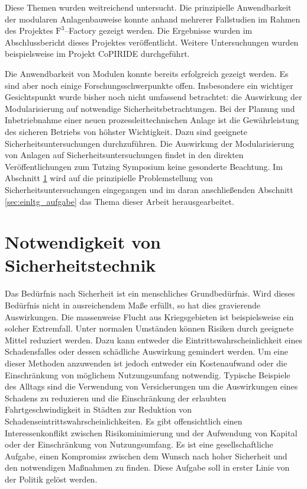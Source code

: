 Diese Themen wurden weitreichend untersucht. Die prinzipielle Anwendbarkeit der modularen Anlagenbauweise konnte anhand mehrerer Fallstudien im Rahmen des Projektes $\text{F}^{3}$--Factory gezeigt werden. Die Ergebnisse wurden im Abschlussbericht dieses Projektes \cite{f3_2014} ver\"offentlicht. \hfill \newline
Weitere Untersuchungen wurden beispielsweise im Projekt CoPIRIDE \cite{copiride_2014} durchgef\"uhrt. \hfill \newline

Die Anwendbarkeit von Modulen konnte bereits erfolgreich gezeigt werden. Es sind aber noch einige Forschungsschwerpunkte offen. Insbesondere ein wichtiger Gesichtspunkt wurde bisher noch nicht umfassend betrachtet: die Auswirkung der Modularisierung auf notwendige Sicherheitsbetrachtungen. \hfill \newline
Bei der Planung und Inbetriebnahme einer neuen prozessleittechnischen Anlage ist die Gew\"ahrleistung des sicheren Betriebs von h\"ohster Wichtigkeit. Dazu sind geeignete Sicherheitsuntersuchungen durchzuf\"uhren. Die Auswirkung der Modularisierung von Anlagen auf Sicherheitsuntersuchungen findet in den direkten Ver\"offentlichungen zum Tutzing Symposium keine gesonderte Beachtung. Im Abschnitt \ref{sec:einltg_sicherheitstechnik} wird auf die prinzipielle Problemstellung von Sicherheitsuntersuchungen eingegangen und im daran anschlie\ss{}enden Abschnitt \ref{sec:einltg_aufgabe} das Thema dieser Arbeit herausgearbeitet. 

\section{Notwendigkeit von Sicherheitstechnik} \label{sec:einltg_sicherheitstechnik}
Das Bed\"urfnis nach Sicherheit ist ein menschliches Grundbed\"urfnis. Wird dieses Bed\"urfnis nicht in ausreichendem Ma\ss{}e erf\"ullt, so hat dies gravierende Auswirkungen. Die massenweise Flucht aus Kriegsgebieten ist beispielsweise ein solcher Extremfall. \hfill \newline
Unter normalen Umst\"anden k\"onnen Risiken durch geeignete Mittel reduziert werden. Dazu kann entweder die Eintrittswahrscheinlichkeit eines Schadensfalles oder dessen sch\"adliche Auswirkung gemindert werden. Um eine dieser Methoden anzuwenden ist jedoch entweder ein Kostenaufwand oder die Einschr\"ankung von m\"oglichem Nutzungsumfang notwendig. Typische Beispiele des Alltags sind die Verwendung von Versicherungen um die Auswirkungen eines Schadens zu reduzieren und die Einschr\"ankung der erlaubten Fahrtgeschwindigkeit in St\"adten zur Reduktion von Schadenseintrittswahrscheinlichkeiten. Es gibt offensichtlich einen Interessenkonflikt zwischen Risikominimierung und der Aufwendung von Kapital oder der Einschr\"ankung von Nutzungsumfang. \hfill \newline
Es ist eine gesellschaftliche Aufgabe, einen Kompromiss zwischen dem Wunsch nach hoher Sicherheit und den notwendigen Ma\ss{}nahmen zu finden. Diese Aufgabe soll in erster Linie von der Politik gel\"ost werden. \hfill \newline

